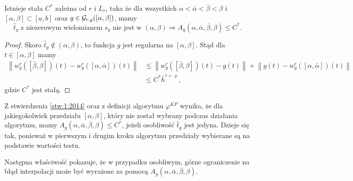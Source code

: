 \documentclass[oik, pdftex, man]{mgrwms}
\begin{document}
    \begin{stw} \label{stw:1:2014}
        Istnieje stała $C^{*}$ zależna od $r$ i $L_{r}$, taka że dla wszystkich $\alpha < \bar{\alpha} < \bar{\beta} < \beta$ i $[\alpha, \beta] \subset [a, b]$ oraz  $g \in \mathcal{G}_{r,\varrho}([\alpha,\beta])$, mamy
        \begin{equation*}
            \hat{t}_{g} \text{ z niezerowym wielomianem } s_{g} \text{ nie jest w } (\alpha, \beta) \Longrightarrow A_{g}(\alpha, \bar{\alpha}, \bar{\beta}, \beta) \leq C^{*}.
        \end{equation*}
    \end{stw}
    \begin{proof}
        Skoro $\hat{t}_{g} \notin (\alpha, \beta)$, to funkcja $g$ jest regularna na $[\alpha, \beta]$. Stąd dla $t \in[\alpha, \beta]$ mamy
        \begin{equation*}
            \begin{aligned}
                \left\|w_{g}^{r}([\bar{\beta}, \beta])(t)-w_{g}^{r}([\alpha, \bar{\alpha}])(t)\right\| & \leq\left\|w_{g}^{r}([\bar{\beta}, \beta])(t)-g(t)\right\|+\left\|g(t)-w_{g}^{r}([\alpha, \bar{\alpha}])(t)\right\| \\
                & \leq C^{*} \bar{h}^{r+\varrho},
            \end{aligned}
        \end{equation*}
    gdzie $C^{*}$ jest stałą.
    \end{proof}

    \begin{uw} \label{uw:1}
        Z stwierdzenia \ref{stw:1:2014} oraz z definicji algorytmu $\varphi^{KP}$ wynika, że dla jakiegokolwiek przedziału $[\alpha, \beta]$, który nie został wybrany podczas działania algorytmu, mamy $A_{g}(\alpha, \bar{\alpha}, \bar{\beta}, \beta) \leq C^{*}$, jeżeli osobliwość $\hat{t}_{g}$ jest jedyna. Dzieje się tak, ponieważ w pierwszym i drugim kroku algorytmu przedziały wybierane są na podstawie wartości testu.
    \end{uw}

    Następna właściwość pokazuje, że w przypadku osobliwym, górne ograniczenie na błąd interpolacji może być wyrażone za pomocą $A_{g}(\alpha, \bar{\alpha}, \bar{\beta}, \beta)$.
\end{document}
